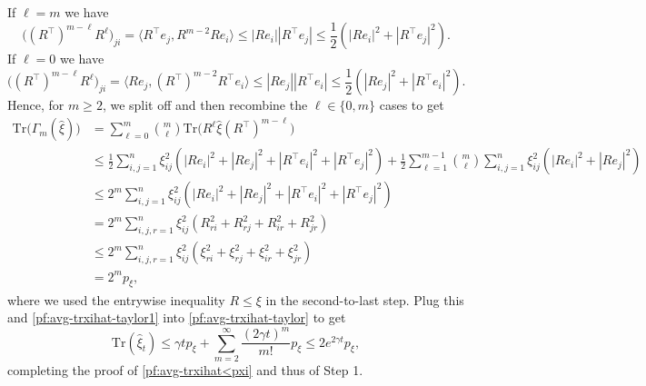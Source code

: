 \documentclass[11pt,reqno]{amsart}
\numberwithin{equation}{section}
\theoremstyle{definition}
\def\tr{{\mathrm{Tr}}}
\begin{document}
If $\ell = m$ we have
\begin{equation*}
\big( (R^\top)^{m-\ell} R^\ell\big)_{ji} = \langle R^\top e_j, R^{m-2}R  e_i\rangle \le  |R e_i||R^\top e_j| \le \frac12(|R e_i|^2 + |R^\top e_j|^2).
\end{equation*}
If $\ell =0$ we have
\begin{equation*}
\big( (R^\top)^{m-\ell} R^\ell\big)_{ji} = \langle  R e_j,  (R^\top)^{m-2} R^\top e_i\rangle \le  |R e_j||R^\top e_i| \le \frac12(|R e_j|^2 + |R^\top e_i|^2).
\end{equation*}
Hence, for $m \ge 2$, we split off and then recombine the $\ell \in \{0,m\}$ cases to get
\begin{align}
\tr\big(\Gamma_m(\widehat{\xi})\big) &= \sum_{\ell=0}^m {m \choose \ell} \tr\big(R^\ell \widehat{\xi} (R^\top)^{m-\ell}\big) \nonumber \\
	&\le \frac12 \sum_{i,j=1}^n \xi_{ij}^2(|R e_i|^2 + |R e_j|^2 + |R^\top e_i|^2 + |R^\top e_j|^2) + \frac12\sum_{\ell=1}^{m-1} {m \choose \ell} \sum_{i,j=1}^n \xi_{ij}^2(|R e_i|^2 + |R e_j|^2) \nonumber \\
	&\le 2^m\sum_{i,j=1}^n \xi_{ij}^2(|R e_i|^2 + |R e_j|^2 + |R^\top e_i|^2 + |R^\top e_j|^2) \nonumber \\
	&= 2^{m }\sum_{i,j,r=1}^n \xi_{ij}^2 ( R_{ri}^2 + R_{rj}^2 +  R_{ir}^2 + R_{jr}^2) \nonumber \\
	&\le 2^{m }\sum_{i,j,r=1}^n \xi_{ij}^2 ( \xi_{ri}^2 + \xi_{rj}^2 +  \xi_{ir}^2 + \xi_{jr}^2)   \\
	&= 2^{m } p_\xi, \label{pf:avg-trxihat-taylor2}
\end{align}
where we used the entrywise inequality $R \le \xi$ in the second-to-last step.
Plug this and \eqref{pf:avg-trxihat-taylor1} into \eqref{pf:avg-trxihat-taylor} to get
\begin{equation*}
\tr(\widehat{\xi}_t) \le \gamma  t  p_\xi+ \sum_{m=2}^\infty \frac{(2\gamma t)^m}{m!} p_\xi \le 2 e^{2\gamma t} p_\xi,  
\end{equation*}
completing the proof of \eqref{pf:avg-trxihat<pxi} and thus of Step 1.


{ \ }
\end{document}
